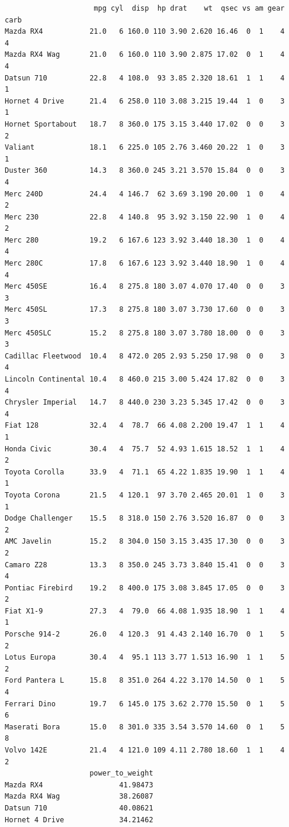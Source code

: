 \documentclass[
  letterpaper,
  DIV=11,
  numbers=noendperiod]{scrreprt}
\begin{document}
\begin{verbatim}
                     mpg cyl  disp  hp drat    wt  qsec vs am gear carb
Mazda RX4           21.0   6 160.0 110 3.90 2.620 16.46  0  1    4    4
Mazda RX4 Wag       21.0   6 160.0 110 3.90 2.875 17.02  0  1    4    4
Datsun 710          22.8   4 108.0  93 3.85 2.320 18.61  1  1    4    1
Hornet 4 Drive      21.4   6 258.0 110 3.08 3.215 19.44  1  0    3    1
Hornet Sportabout   18.7   8 360.0 175 3.15 3.440 17.02  0  0    3    2
Valiant             18.1   6 225.0 105 2.76 3.460 20.22  1  0    3    1
Duster 360          14.3   8 360.0 245 3.21 3.570 15.84  0  0    3    4
Merc 240D           24.4   4 146.7  62 3.69 3.190 20.00  1  0    4    2
Merc 230            22.8   4 140.8  95 3.92 3.150 22.90  1  0    4    2
Merc 280            19.2   6 167.6 123 3.92 3.440 18.30  1  0    4    4
Merc 280C           17.8   6 167.6 123 3.92 3.440 18.90  1  0    4    4
Merc 450SE          16.4   8 275.8 180 3.07 4.070 17.40  0  0    3    3
Merc 450SL          17.3   8 275.8 180 3.07 3.730 17.60  0  0    3    3
Merc 450SLC         15.2   8 275.8 180 3.07 3.780 18.00  0  0    3    3
Cadillac Fleetwood  10.4   8 472.0 205 2.93 5.250 17.98  0  0    3    4
Lincoln Continental 10.4   8 460.0 215 3.00 5.424 17.82  0  0    3    4
Chrysler Imperial   14.7   8 440.0 230 3.23 5.345 17.42  0  0    3    4
Fiat 128            32.4   4  78.7  66 4.08 2.200 19.47  1  1    4    1
Honda Civic         30.4   4  75.7  52 4.93 1.615 18.52  1  1    4    2
Toyota Corolla      33.9   4  71.1  65 4.22 1.835 19.90  1  1    4    1
Toyota Corona       21.5   4 120.1  97 3.70 2.465 20.01  1  0    3    1
Dodge Challenger    15.5   8 318.0 150 2.76 3.520 16.87  0  0    3    2
AMC Javelin         15.2   8 304.0 150 3.15 3.435 17.30  0  0    3    2
Camaro Z28          13.3   8 350.0 245 3.73 3.840 15.41  0  0    3    4
Pontiac Firebird    19.2   8 400.0 175 3.08 3.845 17.05  0  0    3    2
Fiat X1-9           27.3   4  79.0  66 4.08 1.935 18.90  1  1    4    1
Porsche 914-2       26.0   4 120.3  91 4.43 2.140 16.70  0  1    5    2
Lotus Europa        30.4   4  95.1 113 3.77 1.513 16.90  1  1    5    2
Ford Pantera L      15.8   8 351.0 264 4.22 3.170 14.50  0  1    5    4
Ferrari Dino        19.7   6 145.0 175 3.62 2.770 15.50  0  1    5    6
Maserati Bora       15.0   8 301.0 335 3.54 3.570 14.60  0  1    5    8
Volvo 142E          21.4   4 121.0 109 4.11 2.780 18.60  1  1    4    2
                    power_to_weight
Mazda RX4                  41.98473
Mazda RX4 Wag              38.26087
Datsun 710                 40.08621
Hornet 4 Drive             34.21462

\end{verbatim}
\end{document}
